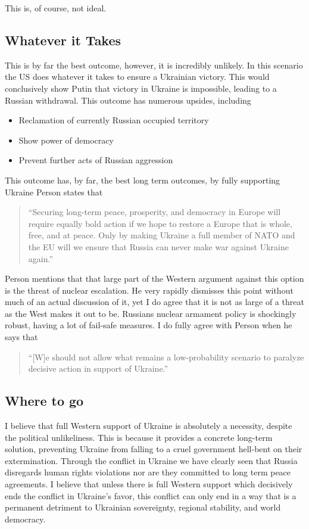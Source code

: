 \documentclass{article}
\begin{document}
        This is, of course, not ideal. 

    \subsection{Whatever it Takes}
        This is by far the best outcome, however, it is incredibly unlikely. In this scenario the US does whatever it takes to ensure a Ukrainian victory. This would conclusively show Putin that victory in Ukraine is impossible, leading to a Russian withdrawal. This outcome has numerous upsides, including 
            \begin{itemize}
                \item Reclamation of currently Russian occupied territory 
                \item Show power of democracy
                \item Prevent further acts of Russian aggression 
            \end{itemize}
        This outcome has, by far, the best long term outcomes, by fully supporting Ukraine Person states that 

        \begin{quote}
            ``Securing long-term peace, prosperity, and democracy in Europe will require equally bold action if we hope to restore a Europe that is whole, free, and at peace. Only by making Ukraine a full member of NATO and the EU will we ensure that Russia can never make war against Ukraine again.''
        \end{quote}

        Person mentions that that large part of the Western argument against this option is the threat of nuclear escalation. He very rapidly dismisses this point without much of an actual discussion of it, yet I do agree that it is not as large of a threat as the West makes it out to be. Russians nuclear armament policy is shockingly robust, having a lot of fail-safe measures. I do fully agree with Person when he says that 

        \begin{quote}
            ``[W]e should not allow what remains a low-probability scenario to paralyze decisive action in support of Ukraine.'' \parencite{person_2025}
        \end{quote}
        
    \subsection{Where to go}
        I believe that full Western support of Ukraine is absolutely a necessity, despite the political unlikeliness. This is because it provides a concrete long-term solution, preventing Ukraine from falling to a cruel government hell-bent on their extermination. Through the conflict in Ukraine we have clearly seen that Russia disregards human rights violations nor are they committed to long term peace agreements. I believe that unless there is full Western support which decisively ends the conflict in Ukraine's favor, this conflict can only end in a way that is a permanent detriment to Ukrainian sovereignty, regional stability, and world democracy.
\end{document}
